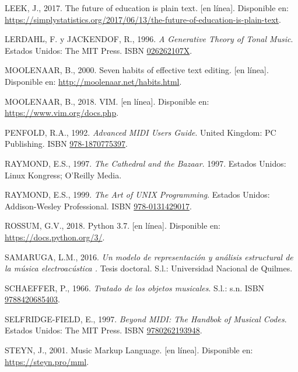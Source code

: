 \documentclass[]{article}
\begin{document}
\leavevmode\hypertarget{ref-leek}{}%
LEEK, J., 2017. The future of education is plain text. {[}en línea{]}.
Disponible en:
\url{https://simplystatistics.org/2017/06/13/the-future-of-education-is-plain-text}.

\leavevmode\hypertarget{ref-lerdahl}{}%
LERDAHL, F. y JACKENDOF, R., 1996. \emph{A Generative Theory of Tonal
Music}. Estados Unidos: The MIT Press. ISBN
\href{https://worldcat.org/isbn/026262107X}{026262107X}.

\leavevmode\hypertarget{ref-moolenaar}{}%
MOOLENAAR, B., 2000. Seven habits of effective text editing. {[}en
línea{]}. Disponible en: \url{http://moolenaar.net/habits.html}.

\leavevmode\hypertarget{ref-vim}{}%
MOOLENAAR, B., 2018. VIM. {[}en línea{]}. Disponible en:
\url{https://www.vim.org/docs.php}.

\leavevmode\hypertarget{ref-penfold}{}%
PENFOLD, R.A., 1992. \emph{Advanced MIDI Users Guide}. United Kingdom:
PC Publishing. ISBN
\href{https://worldcat.org/isbn/978-1870775397}{978-1870775397}.

\leavevmode\hypertarget{ref-raymond2}{}%
RAYMOND, E.S., 1997. \emph{The Cathedral and the Bazaar}. 1997. Estados
Unidos: Linux Kongress; O'Reilly Media.

\leavevmode\hypertarget{ref-raymond}{}%
RAYMOND, E.S., 1999. \emph{The Art of UNIX Programming}. Estados Unidos:
Addison-Wesley Professional. ISBN
\href{https://worldcat.org/isbn/978-0131429017}{978-0131429017}.

\leavevmode\hypertarget{ref-python}{}%
ROSSUM, G.V., 2018. Python 3.7. {[}en línea{]}. Disponible en:
\url{https://docs.python.org/3/}.

\leavevmode\hypertarget{ref-samaruga}{}%
SAMARUGA, L.M., 2016. \emph{Un modelo de representación y análisis
estructural de la música electroacústica .} Tesis doctoral. S.l.:
Universidad Nacional de Quilmes.

\leavevmode\hypertarget{ref-schaeffer}{}%
SCHAEFFER, P., 1966. \emph{Tratado de los objetos musicales}. S.l.: s.n.
ISBN \href{https://worldcat.org/isbn/9788420685403}{9788420685403}.

\leavevmode\hypertarget{ref-selfridge}{}%
SELFRIDGE-FIELD, E., 1997. \emph{Beyond MIDI: The Handbok of Musical
Codes}. Estados Unidos: The MIT Press. ISBN
\href{https://worldcat.org/isbn/9780262193948}{9780262193948}.

\leavevmode\hypertarget{ref-mml}{}%
STEYN, J., 2001. Music Markup Language. {[}en línea{]}. Disponible en:
\url{https://steyn.pro/mml}.
\end{document}
